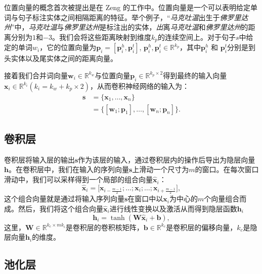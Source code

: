 位置向量的概念首次被提出是在 Zeng \cite{zeng2014relation} 的工作中。位置向量是一个可以表明给定单词与句子标注实体之间相隔距离的特征。举个例子，``\emph{马克吐温}出生于\emph{佛罗里达州}''中，\emph{马克吐温}与\emph{佛罗里达州}是标注出的实体，\emph{出}离\emph{马克吐温}和\emph{佛罗里达州}的距离分别为$1$和$-3$。我们会将这些距离映射到维度$k_p$的连续空间上。对于句子$s$中给定的单词$w_i$，它的位置向量为$\mathbf{p}_i = [\mathbf{p}^h_i, \mathbf{p}^t_i]$, $\mathbf{p}^h_i, \mathbf{p}^t_i \in \mathbb{R}^{k_p}$，其中$\mathbf{p}^h_i$ 和 $\mathbf{p}^t_i$分别是到头实体以及尾实体之间的距离向量。

接着我们合并词向量$\mathbf{w}_i \in \mathbb{R}^{k_w} $与位置向量$\mathbf{p}_i \in \mathbb{R}^{k_p \times 2} $得到最终的输入向量$\mathbf{x}_i \in \mathbb{R}^{k_i} (k_i = k_w + k_p \times 2)$，从而卷积神经网络的输入为：
\begin{align}
\mathbf{s} & = \{\mathbf{x}_1,\ldots, \mathbf{x}_n\} \\\nonumber
&=\{[\mathbf{w}_1;\mathbf{p}_1],\ldots, [\mathbf{w}_n;\mathbf{p}_n]\}.
\end{align}

\subsection{卷积层}

卷积层将输入层的输出$\mathbf{s}$作为该层的输入，通过卷积层内的操作后导出为隐层向量$\mathbf{h}$。在卷积层中，我们在输入的序列向量$\mathbf{s}$上滑动一个尺寸为$m$的窗口。在每次窗口滑动中，我们可以采样得到一个局部的组合向量$\mathbf{\hat{x}}_i$：
\begin{equation}
\mathbf{\hat{x}}_i = \big[ \mathbf{x}_{i - \frac{m-1}{2}}; \ldots ; \mathbf{x}_i; \ldots ;\mathbf{x}_{i + \frac{m-1}{2}} \big],
\end{equation}
这个组合向量就是通过将输入序列向量$\mathbf{s}$在窗口中以$\mathbf{x}_i$为中心的$m$个向量组合而成。然后，我们将这个组合向量$\mathbf{\hat{x}}_i$进行线性变换以及激活从而得到隐层函数$\mathbf{h}_i$
\begin{equation}
\mathbf{h}_i = \tanh(\mathbf{W}\mathbf{\hat{x}}_i + \mathbf{b}),
\end{equation}
这里，$\mathbf{W} \in \mathbb{R}^{k_c \times mk_i}$是卷积层的卷积核矩阵，$\mathbf{b} \in \mathbb{R}^{k_c}$是卷积层的偏移向量，$k_c$是隐层向量$\mathbf{h}_i$的维度。

\subsection{池化层}

